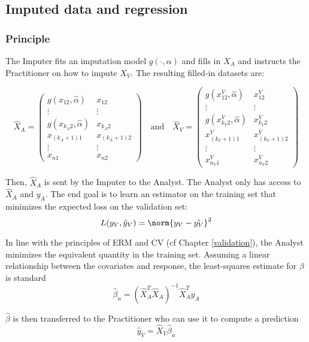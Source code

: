 		\subsection{Imputed data and regression}
			\subsubsection{Principle}
The Imputer fits an imputation model $g(\cdot, \alpha)$ and fills in $X_A$ and instructs the Practitioner on how to impute $X_V$. The resulting filled-in datasets are:

\begin{equation*}
\hat{X}_A = 
\begin{pmatrix}
g(x_{12},\hat{\alpha}) & x_{12} \\
\vdots & \vdots \\
g(x_{k_A 2},\hat{\alpha}) & x_{k_A 2} \\
x_{(k_A+1)1} & x_{(k_A+1)2}\\
\vdots & \vdots \\
x_{n 1} & x_{n 2}
\end{pmatrix}
\quad \mathrm{and} \quad
\hat{X}_V = 
\begin{pmatrix}
g(x_{12}^V,\hat{\alpha}) & x_{12}^V \\
\vdots & \vdots \\
g(x_{k_V 2}^V,\hat{\alpha}) & x_{k_V 2}^V \\
x_{(k_V+1)1}^V & x_{(k_V+1)2}^V\\
\vdots & \vdots \\
x_{n_V 1}^V & x_{n_V 2}^V
\end{pmatrix}
\end{equation*}

Then, $\hat{X}_A$ is sent by the Imputer to the Analyst. The Analyst only has access to $\hat{X}_A$ and $y_A$. 
The end goal is to learn an estimator on the training set that minimizes the expected loss on the validation set:
$$
L(y_V, \hat{y}_V) = \norm{y_V - \hat{y_V}}^2
$$

In line with the principles of ERM and CV (cf Chapter \ref{validation}), the Analyst minimizes the equivalent quantity in the training set. Assuming a linear relationship between the covariates and response, the least-squares estimate for $\beta$ is standard \cite{seber2012linear}
$$
\hat{\beta}_n = (\hat{X}_A^T \hat{X}_A)^{-1} \hat{X}_A^T y_A 
$$

$\hat{\beta}$ is then transferred to the Practitioner who can use it to compute a prediction
$$\hat{y}_V = \hat{X}_V \hat{\beta}_n $$

